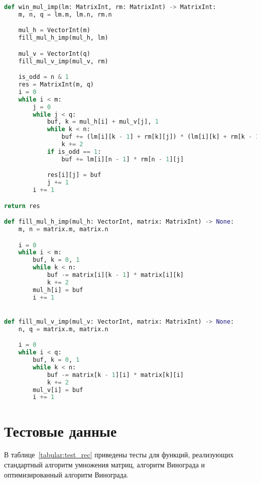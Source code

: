 \begin{lstlisting}[style=mypython, label=lst:win-imp,caption=Функция для перемножения матриц оптимизированным алгоритмом Винограда,language=python]
def win_mul_imp(lm: MatrixInt, rm: MatrixInt) -> MatrixInt:
    m, n, q = lm.m, lm.n, rm.n

    mul_h = VectorInt(m)
    fill_mul_h_imp(mul_h, lm)

    mul_v = VectorInt(q)
    fill_mul_v_imp(mul_v, rm)

    is_odd = n & 1
    res = MatrixInt(m, q)
    i = 0
    while i < m:
        j = 0
        while j < q:
            buf, k = mul_h[i] + mul_v[j], 1
            while k < n:
                buf += (lm[i][k - 1] + rm[k][j]) * (lm[i][k] + rm[k - 1][j])
                k += 2
            if is_odd == 1:
                buf += lm[i][n - 1] * rm[n - 1][j]

            res[i][j] = buf
            j += 1
        i += 1

return res

def fill_mul_h_imp(mul_h: VectorInt, matrix: MatrixInt) -> None:
    m, n = matrix.m, matrix.n

    i = 0
    while i < m:
        buf, k = 0, 1
        while k < n:
            buf -= matrix[i][k - 1] * matrix[i][k]
            k += 2
        mul_h[i] = buf
        i += 1


def fill_mul_v_imp(mul_v: VectorInt, matrix: MatrixInt) -> None:
    n, q = matrix.m, matrix.n

    i = 0
    while i < q:
        buf, k = 0, 1
        while k < n:
            buf -= matrix[k - 1][i] * matrix[k][i]
            k += 2
        mul_v[i] = buf
        i += 1
\end{lstlisting}


\section{Тестовые данные}

В таблице~\ref{tabular:test_rec} приведены тесты для функций, реализующих 
стандартный алгоритм умножения матриц, алгоритм Винограда и оптимизированный алгоритм Винограда.

